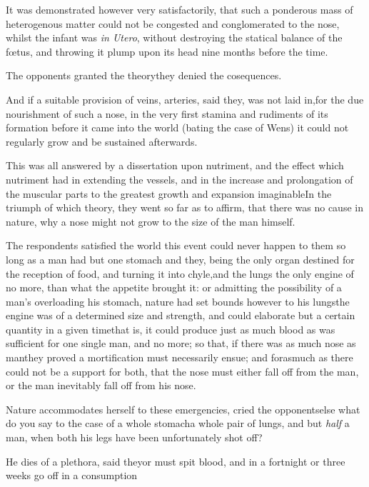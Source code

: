 \documentclass{article}
\begin{document}
It was demonstrated however very satisfactorily, that such a ponderous mass of
heterogenous matter could not be congested and conglomerated to the
nose, whilst the infant was \textit{in Utero}, without destroying the
statical balance of the fœtus, and throwing it plump upon its
head nine months before the time.\tsh

\tsk The opponents granted the theory\tsk\break they
denied the cosequences.

And if a suitable provision of veins, arteries, \etc said
they, was not laid in,\pb for the due nourishment of such a nose, in
the very first stamina and rudiments of its formation  before it
came into the world (bating the case of Wens) it could not
regularly grow and be sustained afterwards.

This was all answered by a dissertation upon nutriment, and the
effect which nutriment had in extending the vessels, and in the
increase and prolongation of the muscular parts to the greatest
growth and expansion imaginable\tsk In the triumph of which
theory, they went so far as to affirm, that there was no cause
in nature, why a nose might not grow to the size of the
man himself.

The respondents satisfied the world this event could never
happen to them so long as a man had but one stomach and\pb
{}
they, being the
only organ destined for the reception of food, and turning
it into chyle,\tsk and the lungs the only engine of
no more, than
what the appetite brought it: or admitting the possibility
of a man’s overloading his stomach, nature had set bounds
however to his lungs\tsk the engine was of a determined size
and strength, and could elaborate but a certain quantity in
a given time\tsk that is, it could produce just as much
blood as was sufficient for one single man, and no more; so
that, if there was as much nose as man\tsk they proved a
mortification must necessarily ensue; and forasmuch as there
could not be a support for both, that the nose must either
fall off from the man, or the man inevitably fall off from
his nose.

\newpage
Nature accommodates herself to these emergencies, cried the
opponents\tsk else what do you say to the case of a whole
stomach\tsk a whole pair of lungs, and but \textit{half} a man, when both
his legs have been unfortunately shot off?\tsk

He dies of a plethora, said they\tsk or must spit blood, and
in a fortnight or three weeks go off in a
consumption\tsk
\end{document}
